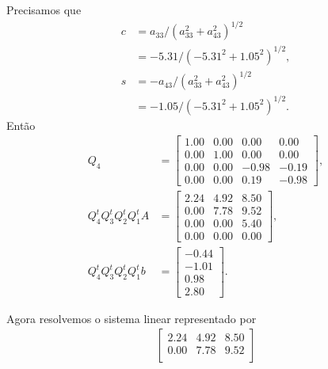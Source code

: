 \documentclass[a4paper,12pt, leqno, answers]{exam}
\begin{document}
\begin{questions}
\begin{solution}
\begin{enumerate}
                Precisamos que
                \begin{align*}
                    c &= a_{33} / \left( a_{33}^2 + a_{43}^2 \right)^{1 / 2} \\
                    &= -5.31 / \left( -5.31^2 + 1.05^2 \right)^{1 / 2}, \\
                    s &= - a_{43} / \left( a_{33}^2 + a_{43}^2 \right)^{1 / 2} \\
                    &= -1.05 / \left( -5.31^2 + 1.05^2 \right)^{1 / 2}.
                \end{align*}
                Ent\~{a}o
                \begin{align*}
                    Q_4 &= \begin{bmatrix}
                        1.00 & 0.00 & 0.00 & 0.00 \\
                        0.00 & 1.00 & 0.00 & 0.00 \\
                        0.00 & 0.00 & -0.98 & -0.19 \\
                        0.00 & 0.00 & 0.19 & -0.98
                    \end{bmatrix}, \\
                    Q_4^t Q_3^t Q_2^t Q_1^t A &= \begin{bmatrix}
                        2.24 & 4.92 & 8.50 \\
                        0.00 & 7.78 & 9.52 \\
                        0.00 & 0.00 & 5.40 \\
                        0.00 & 0.00 & 0.00
                    \end{bmatrix}, \\
                    Q_4^t Q_3^t Q_2^t Q_1^t b &= \begin{bmatrix}
                        -0.44 \\
                        -1.01 \\
                        0.98 \\
                        2.80
                    \end{bmatrix}.
                \end{align*}
        \end{enumerate}
        Agora resolvemos o sistema linear representado por
        \begin{align*}
            \begin{bmatrix}
                2.24 & 4.92 & 8.50 \\
                0.00 & 7.78 & 9.52 \\

\end{bmatrix}
\end{align*}
\end{solution}
\end{questions}
\end{document}
